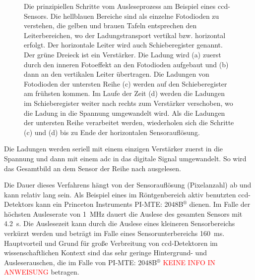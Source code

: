 \begin{figure}[H]
    \caption{Die prinzipiellen Schritte vom Ausleseprozess am Beispiel eines  \gls{ccd}-Sensors. Die hellblauen Bereiche sind als einzelne Fotodioden zu verstehen, die gelben und brauen Tafeln entsprechen den Leiterbereichen, wo der Ladungstransport vertikal bzw. horizontal erfolgt. Der horizontale Leiter wird auch Schieberegister genannt. Der grüne Dreieck ist ein Verstärker. Die Ladung wird (a) zuerst durch den inneren Fotoeffekt an den Fotodioden aufgebaut und (b) dann an den vertikalen Leiter übertragen. Die Ladungen von Fotodioden der untersten Reihe (c) werden auf den Schieberegister am frühsten kommen. Im Laufe der Zeit (d) werden die Ladungen im Schieberegister weiter nach rechts zum Verstärker verschoben, wo die Ladung in die Spannung umgewandelt wird. Als die Ladungen der untersten Reihe verarbeitet werden, wiederholen sich die Schritte (c) und (d) bis zu Ende der horizontalen Sensorauflösung.}
    \label{fig:ccd_scheme}
\end{figure}
\noindent
Die Ladungen werden seriell mit einem einzigen Verstärker zuerst in die Spannung und dann mit einem \gls{adc} in das digitale Signal umgewandelt. So wird das Gesamtbild an dem Sensor der Reihe nach ausgelesen.

\noindent
Die Dauer dieses Verfahrens hängt von der Sensorauflösung (Pixelanzahl) ab und kann relativ lang sein. Als Beispiel eines im Röntgenbereich aktiv benutzten \gls{ccd}-Detektors kann ein Princeton Instruments
PI-MTE: 2048B$^{\text{®}}$ dienen. Im Falle der höchsten Ausleserate von \SI{1}{\mega\hertz} \cite[s. 81, Readout charakterstik]{mte-manual} dauert die Auslese des gesamten Sensors mit   \SI{4,2}{\second}. Die Auslesezeit kann  durch die Auslese eines kleineren Sensorbereichs verkürzt werden und beträgt im Falle eines  Sensorunterbereichs \SI{160}{\milli\second}. Hauptvorteil und Grund für große Verbreitung von \gls{ccd}-Detektoren im wissenschaftlichen Kontext sind das sehr geringe Hintergrund- und Ausleserauschen, die im Falle von PI-MTE: 2048B$^{\text{®}}$ \textcolor{red}{KEINE INFO IN ANWEISUNG} betragen.

